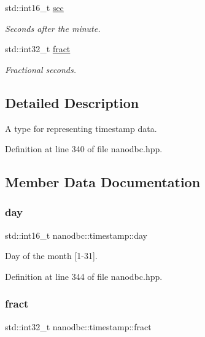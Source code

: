 \begin{DoxyCompactItemize}
std\+::int16\+\_\+t \mbox{\hyperlink{structnanodbc_1_1timestamp_a2656a11498c4efff9488cca0184a0c12}{sec}}
\begin{DoxyCompactList}\small\item\em Seconds after the minute. \end{DoxyCompactList}\item 
std\+::int32\+\_\+t \mbox{\hyperlink{structnanodbc_1_1timestamp_acd79e708ae57b7419d6fed2365776b9a}{fract}}
\begin{DoxyCompactList}\small\item\em Fractional seconds. \end{DoxyCompactList}\end{DoxyCompactItemize}


\subsection{Detailed Description}
A type for representing timestamp data. 

Definition at line 340 of file nanodbc.\+hpp.



\subsection{Member Data Documentation}
\mbox{\label{structnanodbc_1_1timestamp_a5ca9eb0eb39990449ba3f855e119f487}} 
\subsubsection{\texorpdfstring{day}{day}}
{\footnotesize\ttfamily std\+::int16\+\_\+t nanodbc\+::timestamp\+::day}



Day of the month \mbox{[}1-\/31\mbox{]}. 



Definition at line 344 of file nanodbc.\+hpp.

\mbox{\label{structnanodbc_1_1timestamp_acd79e708ae57b7419d6fed2365776b9a}} 
\subsubsection{\texorpdfstring{fract}{fract}}
{\footnotesize\ttfamily std\+::int32\+\_\+t nanodbc\+::timestamp\+::fract}



